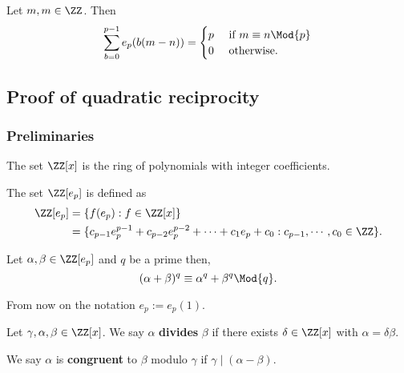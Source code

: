 \documentclass[12pt, a4paper]{article}
\begin{document}
\begin{lemma}
    Let \(m,m \in \ZZ\). Then 
    \[\begin{aligned}
        \sum_{b=0}^{p-1} e_p(b(m-n)) = \begin{cases}
        p &\text{ if } m\equiv n \Mod{p} \\
        0 &\text{ otherwise.}
        \end{cases}
    \end{aligned}\]
\end{lemma}

\subsection{Proof of quadratic reciprocity}

\subsubsection{Preliminaries}

\begin{definition}
    The set \(\ZZ[x]\) is the ring of polynomials with integer coefficients.
\end{definition}

\begin{definition}
    The set \(\ZZ[e_p]\) is defined as
    \[\begin{aligned}
        \ZZ[e_p]&=\{f(e_p) : f \in \ZZ[x]\} \\
                &=\{c_{p-1} e_p^{p-1} + c_{p-2}e_p^{p-2}+\cdots +c_1 e_p +c_0 : c_{p-1},\cdots, c_0 \in \ZZ\}.
    \end{aligned}\]
\end{definition}

\begin{mdremark}
    Let \(\alpha,\beta \in \ZZ[e_p]\) and \(q\) be a prime then,
    \[(\alpha+\beta)^q \equiv \alpha^q+\beta^q \Mod{q}.\]
\end{mdremark}

\begin{mdremark}
    From now on the notation \(e_p :=e_p(1)\).
\end{mdremark}

\begin{definition}
    Let \(\gamma, \alpha, \beta \in \ZZ[x]\). We say \(\alpha\) \textbf{divides} \(\beta\) if there exists \(\delta \in \ZZ[x]\) with \(\alpha = \delta \beta\).
\end{definition}

\begin{definition}
    We say \(\alpha\) is \textbf{congruent} to \(\beta\) modulo \(\gamma\) if \(\gamma \mid (\alpha-\beta)\).
\end{definition}
\end{document}
